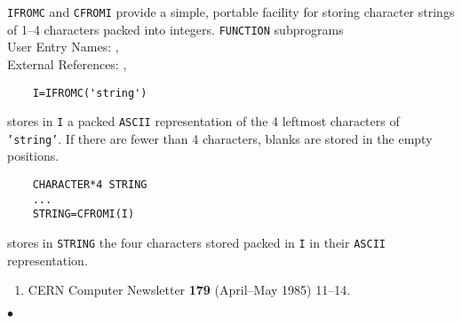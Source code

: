                        
                      
\Submitter{}                              
                        
{\tt IFROMC} and {\tt CFROMI} provide a simple, portable facility for
storing character strings of 1--4 characters packed into integers.
\Structure
{\tt FUNCTION} subprograms \\
User Entry Names: , \\
External References:  , 
\Usage
\begin{verbatim}
    I=IFROMC('string')
\end{verbatim}
stores in {\tt I} a packed {\tt ASCII} representation of the 4
leftmost characters of {\tt 'string'}. If there are fewer than 4
characters, blanks are stored in the empty positions.
\begin{verbatim}
    CHARACTER*4 STRING
    ...
    STRING=CFROMI(I)
\end{verbatim}
stores in {\tt STRING} the four characters stored packed in {\tt I}
in their {\tt ASCII} representation.
\Refer
\begin{enumerate}
\item CERN Computer Newsletter {\bf 179} (April--May 1985) 11--14.
\end{enumerate}
$\bullet$

